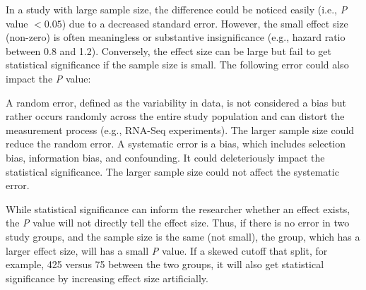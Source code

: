 \documentclass[jpm,article,submit,moreauthors,pdftex]{Definitions/mdpi}
\newenvironment{MyColorPar}[1]{%
    \leavevmode\color{#1}\ignorespaces%
}{%
}%
\begin{document}
\begin{paracol}{2}
\begin{MyColorPar}{red}
In a study with large sample size, the difference could be noticed easily (i.e., \textit{P} value $< 0.05$) due to a decreased standard error\cite{Sullivan2012}.
However, the small effect size (non-zero) is often meaningless or substantive insignificance (e.g., hazard ratio between 0.8 and 1.2).
Conversely, the effect size can be large but fail to get statistical significance if the sample size is small. 
The following error could also impact the \textit{P} value:
\begin{outline}
\1 A random error, defined as the variability in data, is not considered a bias but rather occurs randomly across the entire study population and can distort the measurement process (e.g., RNA-Seq experiments).
The larger sample size could reduce the random error. 
\1 A systematic error is a bias, which includes selection bias, information bias, and confounding.
It could deleteriously impact the statistical significance.
The larger sample size could not affect the systematic error.
\end{outline}
While statistical significance can inform the researcher whether an effect exists, the \textit{P} value will not directly tell the effect size.
Thus, if there is no error in two study groups, and the sample size is the same (not small), the group, which has a larger effect size, will has a small \textit{P} value\cite{Thiese2016}.
If a skewed cutoff that split, for example, 425 versus 75 between the two groups, it will also get statistical significance by increasing effect size artificially.


\end{MyColorPar}
\end{paracol}
\end{document}
